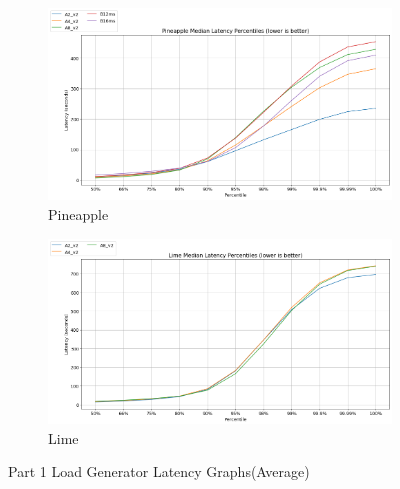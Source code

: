 \begin{figure}[H]
     \centering
     \begin{subfigure}[b]{0.49\textwidth}
         \centering
         \includegraphics[width=\textwidth]{images/pineapple_latency.png}
         \caption{Pineapple} 
         \label{fig:pineapple_cpu}
     \end{subfigure}
     \hfill
     \begin{subfigure}[b]{0.49\textwidth}
         \centering
         \includegraphics[width=\textwidth]{images/lime_latency.png}
         \caption{Lime}
         \label{fig:lime_cpu}
     \end{subfigure}
    
        \caption{Part 1 Load Generator Latency Graphs(Average)}
        \label{fig:part_1_cpu}
\end{figure}
